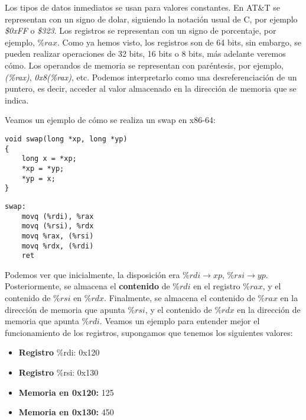 Los tipos de datos inmediatos se usan para valores constantes. En AT\&T se representan con un signo de dolar, siguiendo la notación
usual de C, por ejemplo \textit{\$0xFF} o \textit{\$323}. Los registros se representan con un signo de porcentaje, por ejemplo, $\%rax$.
Como ya hemos visto, los registros son de 64 bits, sin embargo, se pueden realizar operaciones de 32 bits, 16 bits o 8 bits, más adelante veremos cómo.
Los operandos de memoria se representan con paréntesis, por ejemplo, \textit{(\%rax)}, \textit{0x8(\%rax)}, etc. Podemos interpretarlo como una
desreferenciación de un puntero, es decir, acceder al valor almacenado en la dirección de memoria que se indica.
\begin{ejemplo}
	Veamos un ejemplo de cómo se realiza un swap en x86-64:
	\begin{center} %
		\begin{minipage}{0.45\textwidth}
			\begin{verbatim}
void swap(long *xp, long *yp) 
{
    long x = *xp;
    *xp = *yp;
    *yp = x;
}
                \end{verbatim}
		\end{minipage}
		\begin{minipage}{0.45\textwidth}
			\begin{verbatim}
swap:
    movq (%rdi), %rax
    movq (%rsi), %rdx
    movq %rax, (%rsi)
    movq %rdx, (%rdi)
    ret
                \end{verbatim}
		\end{minipage}
	\end{center}
	Podemos ver que inicialmente, la disposición era $\% rdi \rightarrow xp$, $\% rsi \rightarrow yp$.
	Posteriormente, se almacena el \textbf{contenido} de $\%rdi$ en el registro $\%rax$, y el contenido de $\%rsi$ en $\%rdx$.
	Finalmente, se almacena el contenido de $\%rax$ en la dirección de memoria que apunta $\%rsi$, y el contenido de $\%rdx$ en la dirección de memoria que apunta $\%rdi$.
	Veamos un ejemplo para entender mejor el funcionamiento de los registros, supongamos que tenemos los siguientes valores:
	\begin{itemize}
		\item \textbf{Registro }$\%$rdi: 0x120
		\item \textbf{Registro }$\%$rsi: 0x130
		\item \textbf{Memoria en 0x120: } 125
		\item \textbf{Memoria en 0x130: } 450
	\end{itemize}

\end{ejemplo}
